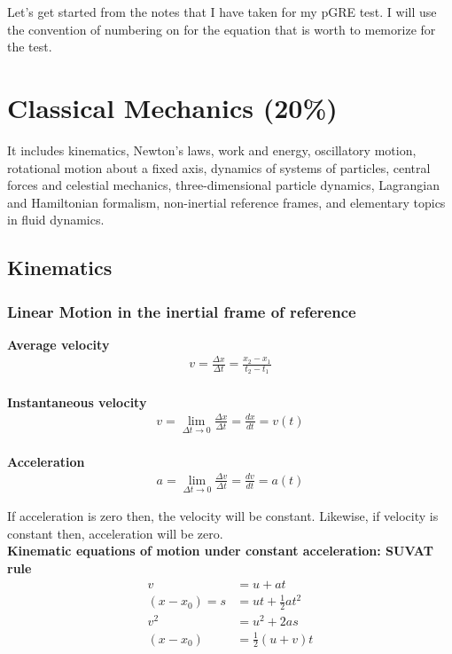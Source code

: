 \documentclass[12pt,a4paper]{article}
\begin{document}
Let's get started from the notes that I have taken for my pGRE test. I will use the convention of numbering on for the equation that is worth to memorize for the test.

\section{Classical Mechanics (20\%)}

It includes kinematics, Newton's laws, work and energy, oscillatory motion, rotational motion about a fixed axis, dynamics of systems of particles, central forces and celestial mechanics, three-dimensional particle dynamics, Lagrangian and Hamiltonian formalism, non-inertial reference frames, and elementary topics in fluid dynamics.

\subsection{Kinematics}

\subsubsection{Linear Motion in the inertial frame of reference}

\noindent\textbf{Average velocity}
\begin{align*}
v = \frac{\Delta x}{\Delta t} = \frac{x_{2} - x_{1}}{t_{2} - t_{1}}
\end{align*}
\\
\textbf{Instantaneous velocity}
\begin{align*}
v = \lim_{\Delta t \to 0} \frac{\Delta x}{\Delta t} = \frac{dx}{dt} = v(t)
\end{align*}
\\
\textbf{Acceleration}
\begin{align*}
a = \lim_{\Delta t \to 0} \frac{\Delta v}{\Delta t} = \frac{dv}{dt} = a(t)
\end{align*}

If acceleration is zero then, the velocity will be constant. Likewise, if velocity is constant then, acceleration will be zero.
\\ 
\textbf{Kinematic equations of motion under constant acceleration: SUVAT rule}
\begin{align}
v &= u + at\\
(x - x_{0}) = s &= ut + \frac{1}{2}at^{2} \\
v^{2} &= u^{2} + 2as \\
(x - x_{0}) &= \frac{1}{2}(u + v)t 
\end{align}
\end{document}
